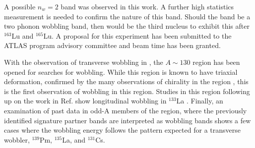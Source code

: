 A possible $n_w=2$ band was observed in this work. A further high statistics measurement is needed to confirm the nature of this band. Should the band be a two phonon wobbling band, then \pr{} would be the third nucleus to exhibit this after $^{163}$Lu and $^{165}$Lu. A proposal for this experiment has been submitted to the ATLAS program advisory committee and beam time has been granted.

With the observation of transverse wobbling in \pr{}, the $A\sim{}130$ region has been opened for searches for wobbling. While this region is known to have triaxial deformation, confirmed by the many observations of chirality in the region \cite{chiralityIn134Pr,chiralityA130Region,chiralityUpperA130Region,chiralityA130Region2,chirality136Pm,chiralityMore135Nd,chiralityIn135Nd,chiralityMulti133Cs}, this is the first observation of wobbling in this region. Studies in this region following up on the work in Ref. \cite{mattaTransversePRL} show longitudinal wobbling in $^{133}$La \cite{palitLongWobbling}. Finally, an examination of past data in odd-A members of the region, where the previously identified signature partner bands are interpreted as wobbling bands shows a few cases where the wobbling energy follows the pattern expected for a transverse wobbler, $^{139}$Pm, $^{135}$La, and $^{131}$Cs.

